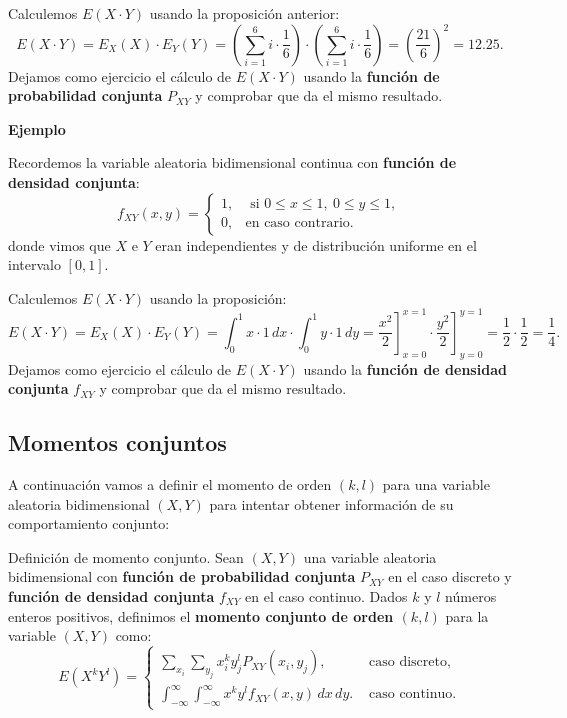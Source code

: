 \documentclass[]{book}
\begin{document}
Calculemos \(E(X\cdot Y)\) usando la proposición anterior:
\[
E(X\cdot Y)=E_X(X)\cdot E_Y(Y)=\left(\sum_{i=1}^6 i\cdot \frac{1}{6}\right)\cdot \left(\sum_{i=1}^6 i\cdot \frac{1}{6}\right)=\left(\frac{21}{6}\right)^2 = 12.25.
\]
Dejamos como ejercicio el cálculo de \(E(X\cdot Y)\) usando la \textbf{función de probabilidad conjunta} \(P_{XY}\) y comprobar que da el mismo resultado.

\textbf{Ejemplo}

Recordemos la variable aleatoria bidimensional continua con \textbf{función de densidad conjunta}:
\[
f_{XY}(x,y)=\begin{cases}
1, & \mbox{ si }0\leq x\leq 1,\ 0\leq y\leq 1, \\
0, & \mbox{en caso contrario.}
\end{cases}
\]
donde vimos que \(X\) e \(Y\) eran independientes y de distribución uniforme en el intervalo \([0,1]\).

Calculemos \(E(X\cdot Y)\) usando la proposición:
\[
E(X\cdot Y)=E_X(X)\cdot E_Y(Y)=\int_0^1 x\cdot 1\, dx\cdot \int_0^1 y\cdot 1\, dy =\left.\frac{x^2}{2}\right]_{x=0}^{x=1}\cdot \left.\frac{y^2}{2}\right]_{y=0}^{y=1}=\frac{1}{2}\cdot \frac{1}{2}=\frac{1}{4}.
\]
Dejamos como ejercicio el cálculo de \(E(X\cdot Y)\) usando la \textbf{función de densidad conjunta} \(f_{XY}\) y comprobar que da el mismo resultado.

\hypertarget{momentos-conjuntos}{%
\subsection{Momentos conjuntos}\label{momentos-conjuntos}}

A continuación vamos a definir el momento de orden \((k,l)\) para una variable aleatoria bidimensional \((X,Y)\) para intentar obtener información de su comportamiento conjunto:

Definición de momento conjunto.
Sean \((X,Y)\) una variable aleatoria bidimensional con \textbf{función de probabilidad conjunta} \(P_{XY}\) en el caso discreto y \textbf{función de densidad conjunta} \(f_{XY}\) en el caso continuo. Dados \(k\) y \(l\) números enteros positivos, definimos el \textbf{momento conjunto de orden \((k,l)\)} para la variable \((X,Y)\) como:
\[
E\left(X^k Y^l\right)=\begin{cases}
\sum_{x_i}\sum_{y_j} x_i^k y_j^l P_{XY}(x_i,y_j), & \mbox{ caso discreto,} \\
\int_{-\infty}^\infty\int_{-\infty}^\infty x^k y^l f_{XY}(x,y)\, dx\, dy. & \mbox{ caso continuo.}
\end{cases}
\]
\end{document}
